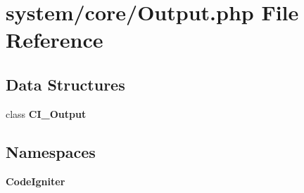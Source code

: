 \section{system/core/\-Output.php File Reference}
\label{_output_8php}
\subsection*{Data Structures}
\begin{DoxyCompactItemize}
\item 
class {\bf C\-I\-\_\-\-Output}
\end{DoxyCompactItemize}
\subsection*{Namespaces}
\begin{DoxyCompactItemize}
\item 
{\bf Code\-Igniter}
\end{DoxyCompactItemize}
